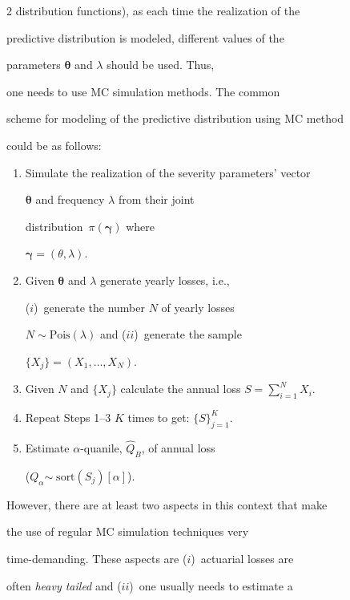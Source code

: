 \begin{multicols}{2}
distribution functions), as each time the realization of the

predictive distribution is modeled, different values of the

parameters $\boldsymbol\theta$ and $\lambda$ should be used. Thus,

one needs to use MC simulation methods. The common

scheme for modeling of the predictive distribution using MC method

could be as follows:

\begin{enumerate}[1.]

\item

Simulate the realization of the severity parameters' vector

$\boldsymbol\theta$ and frequency $\lambda$ from their joint

distribution~$\pi(\boldsymbol\gamma)$ where

$\boldsymbol\gamma=(\theta,\lambda)$.

\item Given $\boldsymbol\theta$ and $\lambda$ generate yearly losses, i.e.,

($i$)~generate the number $N$ of yearly losses

$N\sim\mbox{Pois}(\lambda)$ and ($ii$)~generate the sample

$\{X_j\}=(X_1,\dots,X_N)$.

\item Given $N$ and $\{X_j\}$ calculate the annual loss $S=\sum\limits_{i=1}^N X_i$.

\item Repeat Steps 1--3 $K$ times to get: $\{S\}_{j=1}^K$.

\item Estimate $\alpha$-quanile, $\widehat{Q}_B$, of annual loss

($Q_{\alpha}$\linebreak $\sim\; \mbox{sort}(S_j)[\alpha]$).

\end{enumerate}

However, there are at least two aspects in this context that make

the use of regular MC simulation techniques very

time-demanding. These aspects are ($i$)~actuarial losses are

often {\it heavy tailed} and ($ii$)~one usually needs to estimate a


\end{multicols}
